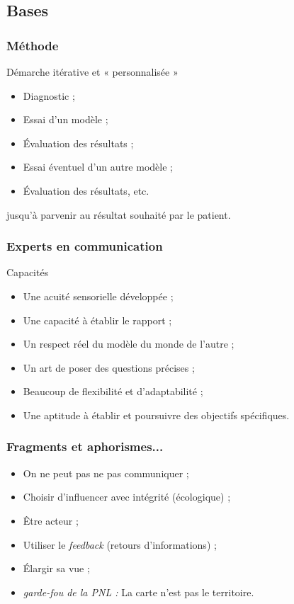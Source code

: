 \documentclass{beamer}
\begin{document}
\subsection{Bases}
\begin{frame}
	\frametitle{Méthode} 
	\begin{block}
		{Démarche itérative et « personnalisée »} 
		\begin{itemize}
			\item Diagnostic ; 
			\item Essai d'un modèle ; 
			\item Évaluation des résultats ; 
			\item Essai éventuel d'un autre modèle ; 
			\item Évaluation des résultats, etc. 
		\end{itemize}
		jusqu'à parvenir au résultat souhaité par le patient. 
	\end{block}
\end{frame}
\begin{frame}
	\frametitle{Experts en communication} 
	\begin{block}
		{Capacités} 
		\begin{itemize}
			\item Une acuité sensorielle développée ; 
			\item Une capacité à établir le rapport ; 
			\item Un respect réel du modèle du monde de l'autre ; 
			\item Un art de poser des questions précises ; 
			\item Beaucoup de flexibilité et d'adaptabilité ; 
			\item Une aptitude à établir et poursuivre des objectifs spécifiques. 
		\end{itemize}
	\end{block}
\end{frame}
\begin{frame}
	\frametitle{Fragments et aphorismes...} 
	\begin{itemize}
		\item On ne peut pas ne pas communiquer ; 
		\item Choisir d'influencer avec intégrité (écologique) ; 
		\item Être acteur ; 
		\item Utiliser le \emph{feedback} (retours d'informations) ; 
		\item Élargir sa vue ; 
		\item \emph{garde-fou de la PNL :} La carte n'est pas le territoire. 
	\end{itemize}
\end{frame}
\end{document}
